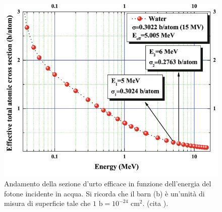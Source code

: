 \documentclass[12pt,a4paper,twoside]{report}
\begin{document}
	\begin{figure}[H]
		\centering
		\includegraphics[width=0.9\linewidth]{attenuation_water.png}
		\caption{Andamento della sezione d'urto efficace in funzione dell'energia del fotone incidente in acqua. Si ricorda che il barn (b) è un'unità di misura di superficie tale che $1\mbox{ b}=10^{-24}\mbox{ cm}^{2}$.  (cita
			).}
		\label{fig:attenuation_water}
	\end{figure}
	
\end{document}
